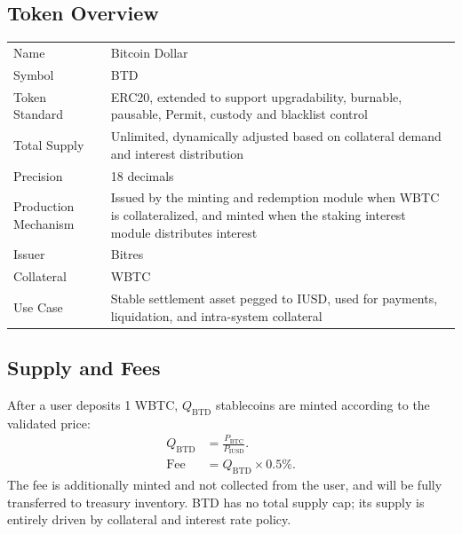 \documentclass{article}
\begin{document}
\subsection{Token Overview}
\begin{tabularx}{\textwidth}{l X}
\toprule
Name & Bitcoin Dollar \\
Symbol & BTD \\
Token Standard & ERC20, extended to support upgradability, burnable, pausable, Permit, custody and blacklist control \\
Total Supply & Unlimited, dynamically adjusted based on collateral demand and interest distribution \\
Precision & 18 decimals \\
Production Mechanism & Issued by the minting and redemption module when WBTC is collateralized, and minted when the staking interest module distributes interest \\
Issuer & Bitres \\
Collateral & WBTC \\
Use Case & Stable settlement asset pegged to IUSD, used for payments, liquidation, and intra-system collateral \\
\bottomrule
\end{tabularx}

\subsection{Supply and Fees}
After a user deposits 1 WBTC, $Q_{\text{BTD}}$ stablecoins are minted according to the validated price:
\begin{align}
Q_{\text{BTD}} &= \frac{ P_{\text{BTC}}}{P_{\text{IUSD}}}. \\
\text{Fee} &= Q_{\text{BTD}} \times 0.5\%.
\end{align}
The fee is additionally minted and not collected from the user, and will be fully transferred to treasury inventory. BTD has no total supply cap; its supply is entirely driven by collateral and interest rate policy.
\end{document}
